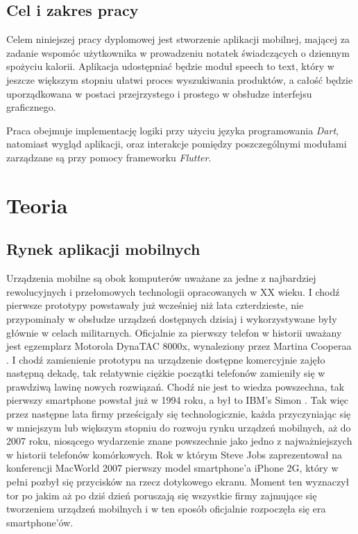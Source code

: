 \documentclass[12pt, a4paper]{article}
\begin{document}
\begin{sloppypar}
{  \subsection{Cel i zakres pracy}
  {
    Celem niniejszej pracy dyplomowej jest stworzenie aplikacji mobilnej, mającej 
    za zadanie wspomóc użytkownika w prowadzeniu notatek świadczących o dziennym
    spożyciu kalorii. Aplikacja udostępniać będzie moduł speech to text,
    który w jeszcze większym stopniu ułatwi proces wyszukiwania produktów, a całość
    będzie uporządkowana w postaci przejrzystego i prostego w obsłudze interfejsu
    graficznego.

    Praca obejmuje implementację logiki przy użyciu języka programowania \emph{Dart},
    natomiast wygląd aplikacji, oraz interakcje pomiędzy poszczególnymi modułami
    zarządzane są przy pomocy frameworku \emph{Flutter}.
  }

}

\section{Teoria}
{
  \subsection{Rynek aplikacji mobilnych}
  {
    Urządzenia mobilne są obok komputerów uważane za jedne z najbardziej rewolucyjnych
    i przełomowych technologii opracowanych w XX wieku. I chodź pierwsze prototypy 
    powstawały już wcześniej niż lata czterdzieste, nie przypominały w obsłudze urządzeń
    dostępnych dzisiaj i wykorzystywane były głównie w celach militarnych.
    Oficjalnie za pierwszy telefon w historii uważany jest egzemplarz Motorola 
    DynaTAC 8000x, wynaleziony przez Martina Cooperaa \cite{history1}. I chodź
    zamienienie prototypu na urządzenie dostępne
    komercyjnie zajęło następną dekadę, tak relatywnie ciężkie początki telefonów
    zamieniły się w prawdziwą lawinę nowych rozwiązań. Chodź nie jest to wiedza
    powszechna, tak pierwszy smartphone powstał już w 1994 roku, a był to IBM's Simon
    \cite{history2}. Tak więc przez następne lata firmy prześcigały się technologicznie,
    każda przyczyniając się w mniejszym lub większym stopniu do rozwoju rynku urządzeń
    mobilnych, aż do 2007 roku, niosącego wydarzenie znane powszechnie jako jedno 
    z najważniejszych w historii telefonów komórkowych. Rok w którym Steve Jobs 
    zaprezentował na konferencji MacWorld 2007 pierwszy model smartphone'a iPhone 2G,
    który w pełni pozbył się przycisków na rzecz dotykowego ekranu. Moment ten wyznaczył
    tor po jakim aż po dziś dzień poruszają się wszystkie firmy zajmujące się tworzeniem
    urządzeń mobilnych i w ten sposób oficjalnie rozpoczęła się era smartphone'ów.

}}
\end{sloppypar}
\end{document}
